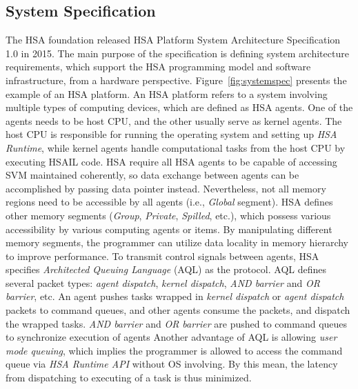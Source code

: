         \subsection{System Specification}
        The HSA foundation released HSA Platform System Architecture Specification 1.0 \cite{systemspec} in 2015.
        The main purpose of the specification is defining system architecture requirements, 
        which support the HSA programming model and software infrastructure, from a hardware perspective.
        Figure~\ref{fig:systemspec} presents the example of an HSA platform.
        An HSA platform refers to a system involving multiple types of computing devices, 
        which are defined as HSA agents.
        One of the agents needs to be host CPU, and the other usually serve as kernel agents. 
        The host CPU is responsible for running the operating system and setting up \textit{HSA Runtime},
        while kernel agents handle computational tasks from the host CPU by executing HSAIL code.
        HSA require all HSA agents to be capable of accessing SVM maintained coherently, 
        so data exchange between agents can be accomplished by passing data pointer instead.
        Nevertheless, not all memory regions need to be accessible by all agents (i.e., \textit{Global} segment).
        HSA defines other memory segments (\textit{Group}, \textit{Private}, \textit{Spilled}, etc.), 
        which possess various accessibility by various computing agents or items.
        By manipulating different memory segments, the programmer can utilize data locality in memory hierarchy to improve performance.
        To transmit control signals between agents, HSA specifies \textit{Architected Queuing Language} (AQL) as the protocol. 
        AQL defines several packet types: \textit{agent dispatch}, \textit{kernel dispatch}, \textit{AND barrier} and \textit{OR barrier}, etc.
        An agent pushes tasks wrapped in \textit{kernel dispatch} or \textit{agent dispatch} packets to command queues, 
        and other agents consume the packets, and dispatch the wrapped tasks.
        \textit{AND barrier} and \textit{OR barrier} are pushed to command queues to synchronize execution of agents 
        Another advantage of AQL is allowing \textit{user mode queuing},
        which implies the programmer is allowed to access the command queue via \textit{HSA Runtime API} without OS involving.
        By this mean, the latency from dispatching to executing of a task is thus minimized.
        \vspace{\textfig}
